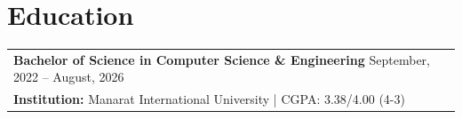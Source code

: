 \section{Education}
\begin{tabularx}{\linewidth}{@{}X@{}}
\textbf{Bachelor of Science in Computer Science \& Engineering} \hfill September, 2022 -- August, 2026\\
\textbf{Institution:} Manarat International University | CGPA: 3.38/4.00 (4-3)
\end{tabularx}
